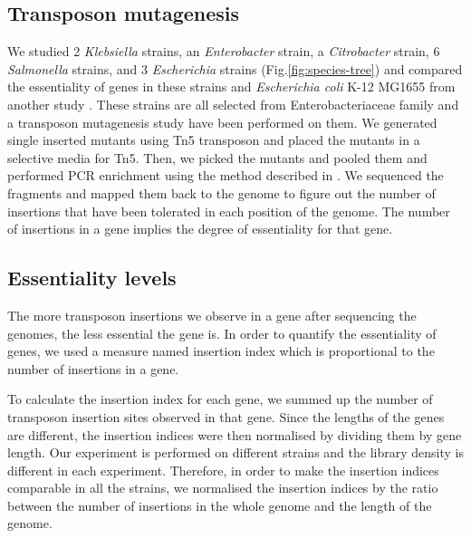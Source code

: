 \documentclass[12pt,letterpaper]{article}
\begin{document}
\subsection{Transposon mutagenesis}\label{sec:transposoninsertion}
We studied 2 \textit{Klebsiella} strains, an \textit{Enterobacter} strain, a \textit{Citrobacter} strain, 6 \textit{Salmonella} strains, and 3 \textit{Escherichia} strains (Fig.\@ \ref{fig:species-tree}) and compared the essentiality of genes in these strains and \textit{Escherichia coli} K-12 MG1655 from another study \cite{baba_construction_2006}. These strains are all selected from Enterobacteriaceae family and a transposon mutagenesis study have been performed on them. We generated single inserted mutants using Tn5 transposon and placed the mutants in a selective media for Tn5. Then, we picked the mutants and pooled them and performed PCR enrichment using the method described in \cite{barquist_tradis_2016}. We sequenced the fragments and mapped them back to the genome to figure out the number of insertions that have been tolerated in each position of the genome. The number of insertions in a gene implies the degree of essentiality for that gene.

\subsection{Essentiality levels}\label{sec:essentiality}
The more transposon insertions we observe in a gene after sequencing the genomes, the less essential the gene is. In order to quantify the essentiality of genes, we used a measure named insertion index which is proportional to the number of insertions in a gene.

To calculate the insertion index for each gene, we summed up the number of transposon insertion sites observed in that gene. Since the lengths of the genes are different, the insertion indices were then normalised by dividing them by gene length. Our experiment is performed on different strains and the library density is different in each experiment. Therefore, in order to make the insertion indices comparable in all the strains, we normalised the insertion indices by the ratio between the number of insertions in the whole genome and the length of the genome.
\end{document}
